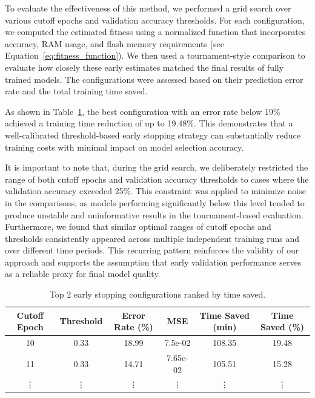 To evaluate the effectiveness of this method, we performed a grid search over various cutoff epochs and validation accuracy thresholds. For each configuration, we computed the estimated fitness using a normalized function that incorporates accuracy, RAM usage, and flash memory requirements (see Equation~\ref{eq:fitness_function}). We then used a tournament-style comparison to evaluate how closely these early estimates matched the final results of fully trained models. The configurations were assessed based on their prediction error rate and the total training time saved.

As shown in Table~\ref{tab:early_stopping_results}, the best configuration with an error rate below 19\% achieved a training time reduction of up to 19.48\%. This demonstrates that a well-calibrated threshold-based early stopping strategy can substantially reduce training costs with minimal impact on model selection accuracy.

It is important to note that, during the grid search, we deliberately restricted the range of both cutoff epochs and validation accuracy thresholds to cases where the validation accuracy exceeded 25\%. This constraint was applied to minimize noise in the comparisons, as models performing significantly below this level tended to produce unstable and uninformative results in the tournament-based evaluation. Furthermore, we found that similar optimal ranges of cutoff epochs and thresholds consistently appeared across multiple independent training runs and over different time periods. This recurring pattern reinforces the validity of our approach and supports the assumption that early validation performance serves as a reliable proxy for final model quality.


\begin{table}[ht]
\centering
\begin{tabular}{cccccc}
\toprule
Cutoff Epoch & Threshold & Error Rate (\%) & MSE & Time Saved (min) & Time Saved (\%) \\
\midrule
10  & 0.33 & 18.99 & 7.5e-02 & 108.35 & 19.48 \\
11  & 0.33 & 14.71 & 7.65e-02 & 105.51 & 15.28 \\
\vdots & \vdots & \vdots & \vdots & \vdots & \vdots \\
\bottomrule
\end{tabular}
\caption{Top 2 early stopping configurations ranked by time saved.}
\label{tab:early_stopping_results}
\end{table}




